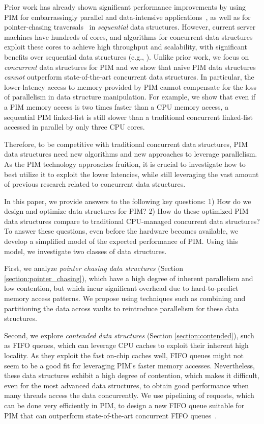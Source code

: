 Prior work has already shown significant performance improvements by
using PIM for embarrassingly parallel and data-intensive
applications~\cite{Zhang2014:TTP, Ahn2015:2, ZhuASSHPF13,
  Akin2015:DRM, Hsieh:2016:TOM}, as well as for pointer-chasing
traversals~\cite{hsieh2016accelerating,Hashemi:2016} in
\emph{sequential} data structures.  However, current server machines
have hundreds of cores, and algorithms for concurrent data structures
exploit these cores to achieve high throughput and scalability, with
significant benefits over sequential data structures (e.g.,
\cite{practicallf, skiplists-concpugh, valois, Herlihy08}).  Unlike
prior work, we focus on \emph{concurrent} data structures for PIM and
we show that naive PIM data structures \emph{cannot} outperform
state-of-the-art concurrent data structures.  In particular, the
lower-latency access to memory provided by PIM cannot compensate for
the loss of parallelism in data structure manipulation.  For example,
we show that even if a PIM memory access is two times faster than a CPU memory
access, a sequential PIM linked-list is still slower than a
traditional concurrent linked-list accessed in parallel by only three
CPU cores.

Therefore, to be competitive with traditional concurrent data
structures, PIM data structures need new algorithms and new approaches
to leverage parallelism.  As the PIM technology approaches fruition,
it is crucial to investigate how to best utilize it to exploit the
lower latencies, while still leveraging the vast amount of previous
research related to concurrent data structures.

In this paper, we provide answers to the following key questions: 1)
How do we design and optimize data structures for PIM? 2) How do these
optimized PIM data structures compare to traditional CPU-managed
concurrent data structures? To answer these questions, even before the
hardware becomes available, we develop a simplified model of the
expected performance of PIM. Using this model, we investigate two
classes of data structures.

First, we analyze \emph{pointer chasing data structures} (Section
\ref{section:pointer_chasing}), which have a high degree of inherent
parallelism and low contention, but which incur significant overhead
due to hard-to-predict memory access patterns.  We propose using
techniques such as combining and partitioning the data across vaults
to reintroduce parallelism for these data structures.

Second, we explore \emph{contended data structures} (Section
\ref{section:contended}), such as FIFO queues, which can leverage CPU
caches to exploit their inherent high locality.  As they exploit the
fast on-chip caches well, FIFO queues might not seem to be a good fit
for leveraging PIM's faster memory accesses.  Nevertheless, these data
structures exhibit a high degree of contention, which makes it
difficult, even for the most advanced data structures, to obtain good
performance when many threads access the data concurrently.  We use
pipelining of requests, which can be done very efficiently in PIM, to
design a new FIFO queue suitable for PIM that can outperform
state-of-the-art concurrent FIFO queues~\cite{Morrison13, Hendler10}.

